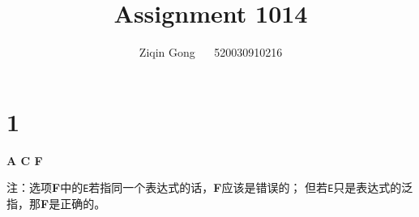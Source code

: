 \documentclass[12pt]{article}
\title{Assignment 1014}
\author{Ziqin Gong $\quad$ 520030910216}
\date{}
\begin{document}
  \maketitle

  \section*{1}

    \textbf{A C F}

    注：选项\textbf{F}中的\texttt{E}若指同一个表达式的话，\textbf{F}应该是错误的；
    但若\texttt{E}只是表达式的泛指，那\textbf{F}是正确的。
\end{document}
